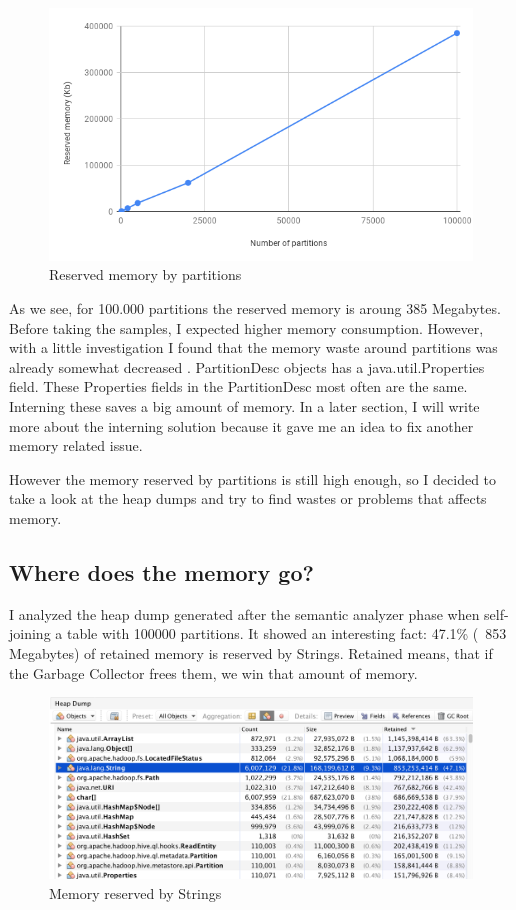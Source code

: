 \begin{figure}[H]
	\includegraphics[width=150mm, keepaspectratio]{figures/partitions_chart.png}
	\centering
	\caption{Reserved memory by partitions}
\end{figure}

As we see, for 100.000 partitions the reserved memory is aroung 385 Megabytes. Before taking the samples, I expected higher memory consumption. However, with a little investigation I found that the memory waste around partitions was already somewhat decreased \cite{hive-partitions}. PartitionDesc objects has a java.util.Properties field. These Properties fields in the PartitionDesc most often are the same. Interning these saves a big amount of memory. In a later section, I will write more about the interning solution because it gave me an idea to fix another memory related issue.

However the memory reserved by partitions is still high enough, so I decided to take a look at the heap dumps and try to find wastes or problems that affects memory.

\subsection{Where does the memory go?}
I analyzed the heap dump generated after the semantic analyzer phase when self-joining a table with 100000 partitions. It showed an interesting fact: 47.1\% (~853 Megabytes) of retained memory is reserved by Strings. Retained means, that if the Garbage Collector frees them, we win that amount of memory. 

\begin{figure}[H]
	\includegraphics[width=150mm, keepaspectratio]{figures/string_memory.png}
	\centering
	\caption{Memory reserved by Strings}
\end{figure}

